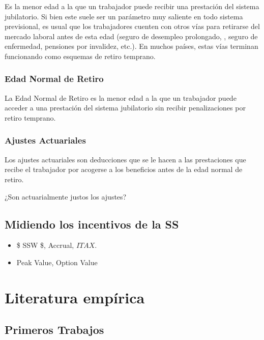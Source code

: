 \documentclass[]{article}
\providecommand{\tightlist}{%
  \setlength{\itemsep}{0pt}\setlength{\parskip}{0pt}}
\begin{document}
Es la menor edad a la que un trabajador puede recibir una prestación del
sistema jubilatorio. Si bien este suele ser un parámetro muy saliente en
todo sistema previsional, es usual que los trabajadores cuenten con
otros vías para retirarse del mercado laboral antes de esta edad (seguro
de desempleo prolongado, , seguro de enfermedad, pensiones por
invalidez, etc.). En muchos países, estas vías terminan funcionando como
esquemas de retiro temprano.

\hypertarget{edad-normal-de-retiro}{%
\subsubsection{Edad Normal de Retiro}\label{edad-normal-de-retiro}}

La Edad Normal de Retiro es la menor edad a la que un trabajador puede
acceder a una prestación del sistema jubilatorio sin recibir
penalizaciones por retiro temprano.

\hypertarget{ajustes-actuariales}{%
\subsubsection{Ajustes Actuariales}\label{ajustes-actuariales}}

Los ajustes actuariales son deducciones que se le hacen a las
prestaciones que recibe el trabajador por acogerse a los beneficios
antes de la edad normal de retiro.

¿Son actuarialmente justos los ajustes?

\hypertarget{midiendo-los-incentivos-de-la-ss}{%
\subsection{Midiendo los incentivos de la
SS}\label{midiendo-los-incentivos-de-la-ss}}

\begin{itemize}
\tightlist
\item
  \$ SSW \$, Accrual, \(ITAX\).
\item
  Peak Value, Option Value
\end{itemize}

\hypertarget{literatura-empuxedrica}{%
\section{Literatura empírica}\label{literatura-empuxedrica}}

\hypertarget{primeros-trabajos}{%
\subsection{Primeros Trabajos}\label{primeros-trabajos}}
\end{document}
